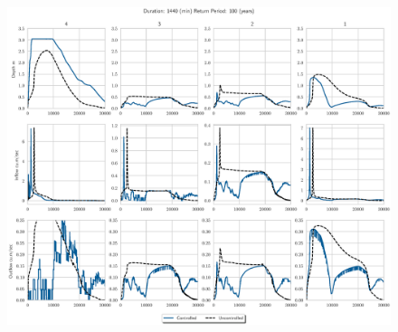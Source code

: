 \begin{figure}
    \centering
    \includegraphics[width=\linewidth]{./RL-SI-figures/77storms/1440100.eps}
\end{figure}


%
